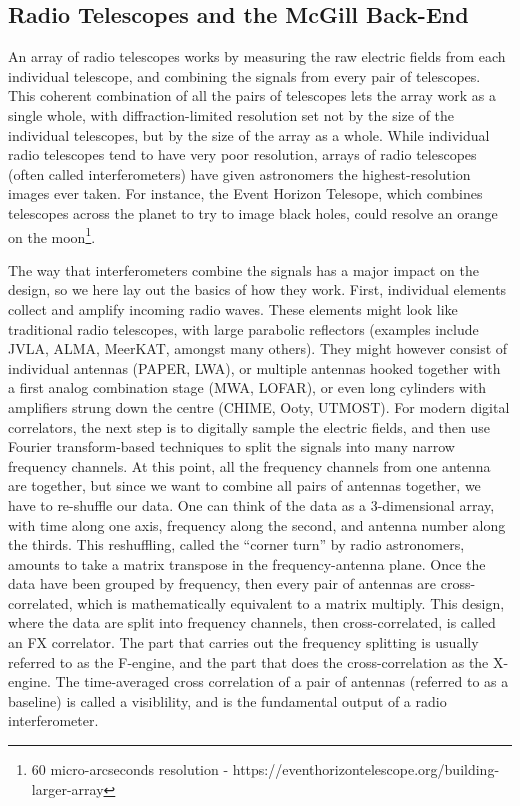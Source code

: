 \documentclass[letterpaper,11pt,preprint]{aastex}
\begin{document}
\subsection{Radio Telescopes and the McGill Back-End}

An array of radio telescopes works by measuring the raw electric
fields from each individual telescope, and combining the signals from
every pair of telescopes.  This coherent combination of all the pairs
of telescopes lets the array work as a single whole, with
diffraction-limited resolution set not by the size of the individual
telescopes, but by the size of the array as a whole.  While individual
radio telescopes tend to have very poor resolution, arrays of radio
telescopes (often called interferometers) have given astronomers the
highest-resolution images ever taken.  For instance, the Event Horizon
Telesope, which combines telescopes across the planet to try to image
black holes, could resolve an orange on the moon\footnote{60
  micro-arcseconds resolution -
  https://eventhorizontelescope.org/building-larger-array}.

The way that interferometers combine the signals has a major impact on
the design, so we here lay out the basics of how they work.  First,
individual elements collect and amplify incoming radio waves.  These
elements might look like traditional radio telescopes, with large
parabolic reflectors (examples include JVLA, ALMA, MeerKAT, amongst
many others).  They might however consist of individual antennas
(PAPER, LWA), or multiple antennas hooked together with a first analog
combination stage (MWA, LOFAR), or even long cylinders with amplifiers
strung down the centre (CHIME, Ooty, UTMOST).  For modern digital
correlators, the next step is to digitally sample the electric fields,
and then use Fourier transform-based techniques to split the signals
into many narrow frequency channels.  At this point, all the frequency
channels from one antenna are together, but since we want to combine
all pairs of antennas together, we have to re-shuffle our data.  One
can think of the data as a 3-dimensional array, with time along one
axis, frequency along the second, and antenna number along the thirds.
This reshuffling, called the ``corner turn'' by radio astronomers,
amounts to take a matrix transpose in the frequency-antenna plane.
Once the data have been grouped by frequency, then every pair of
antennas are cross-correlated, which is mathematically equivalent to a
matrix multiply.  This design, where the data are split into frequency
channels, then cross-correlated, is called an FX correlator.  The part
that carries out the frequency splitting is usually referred to as the
F-engine, and the part that does the cross-correlation as the
X-engine.  The time-averaged cross correlation of a pair of antennas
(referred to as a baseline) is called a visiblility, and is the
fundamental output of a radio interferometer.
\end{document}
